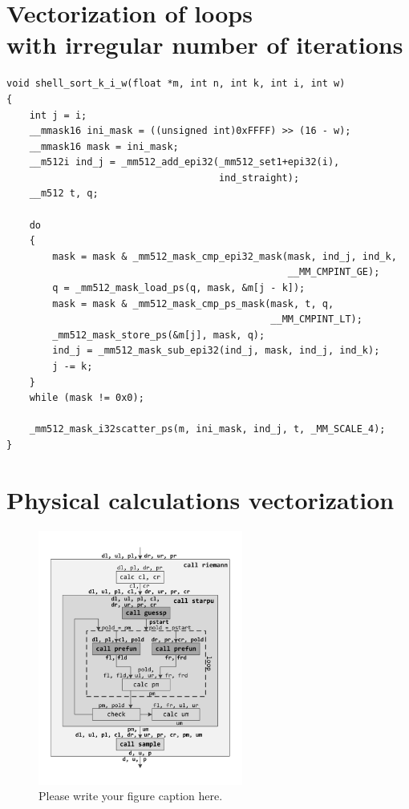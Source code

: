 \documentclass[
11pt,%
tightenlines,%
twoside,%
onecolumn,%
nofloats,%
nobibnotes,%
nofootinbib,%
superscriptaddress,%
noshowpacs,%
centertags]%
{revtex4}
\begin{document}
\section{Vectorization of loops \protect\\
with irregular number of iterations}

\begin{lstlisting}
void shell_sort_k_i_w(float *m, int n, int k, int i, int w)
{
    int j = i;
    __mmask16 ini_mask = ((unsigned int)0xFFFF) >> (16 - w);
    __mmask16 mask = ini_mask;
    __m512i ind_j = _mm512_add_epi32(_mm512_set1+epi32(i),
                                     ind_straight);
    __m512 t, q;

    do
    {
        mask = mask & _mm512_mask_cmp_epi32_mask(mask, ind_j, ind_k,
                                                 __MM_CMPINT_GE);
        q = _mm512_mask_load_ps(q, mask, &m[j - k]);
        mask = mask & _mm512_mask_cmp_ps_mask(mask, t, q,
                                              __MM_CMPINT_LT);
        _mm512_mask_store_ps(&m[j], mask, q);
        ind_j = _mm512_mask_sub_epi32(ind_j, mask, ind_j, ind_k);
        j -= k;
    }
    while (mask != 0x0);
    
    _mm512_mask_i32scatter_ps(m, ini_mask, ind_j, t, _MM_SCALE_4);
}
\end{lstlisting}

\section{Physical calculations vectorization}

\begin{figure}[h]
\setcaptionmargin{5mm}
\onelinecaptionstrue  %
\includegraphics[width=0.6\textwidth]{pics/riemann.pdf}
\caption{Please write your figure caption here.}\label{fig:1}
\end{figure}
\end{document}
